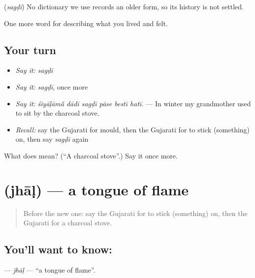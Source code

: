 \begin{cousinweb}
\textbf{} (\emph{sagḍī}) No dictionary we use records an older form, so its history is not settled.
\end{cousinweb}

\begin{grammarlens}[title={What you've built}]
One more word for describing what you lived and felt.
\end{grammarlens}

\subsection*{Your turn}
\begin{itemize}
\raggedright
  \item \emph{Say it:} \emph{sagḍī}
  \item \emph{Say it:} \emph{sagḍī}, once more
  \item \emph{Say it:} \emph{śiyāḷāmā̃ dādī sagḍī pāse bestī hatī.} — In winter my grandmother used to sit by the charcoal stove.
  \item \emph{Recall:} say the Gujarati for mould, then the Gujarati for to stick (something) on, then say \emph{sagḍī} again
\end{itemize}

\begin{tcolorbox}[breakable,colback=teal!4,colframe=teal!35!black,title={Before you move on}]
What does  mean? (\textquotedblleft{}A charcoal stove\textquotedblright{}.) Say it once more.
\end{tcolorbox}
\section[\texorpdfstring{\gu{ઝાળ} (jhāḷ)}{ઝાળ (jhāḷ)}]{ (jhāḷ) — a tongue of flame}

\label{lesson:GU-C519-jhal}



\begin{quote}
Before the new one: say the Gujarati for to stick (something) on, then the Gujarati for a charcoal stove.
\end{quote}

\subsection*{You'll want to know: }
\textbf{} — \emph{jhāḷ} — \textquotedblleft{}a tongue of flame\textquotedblright{}.

